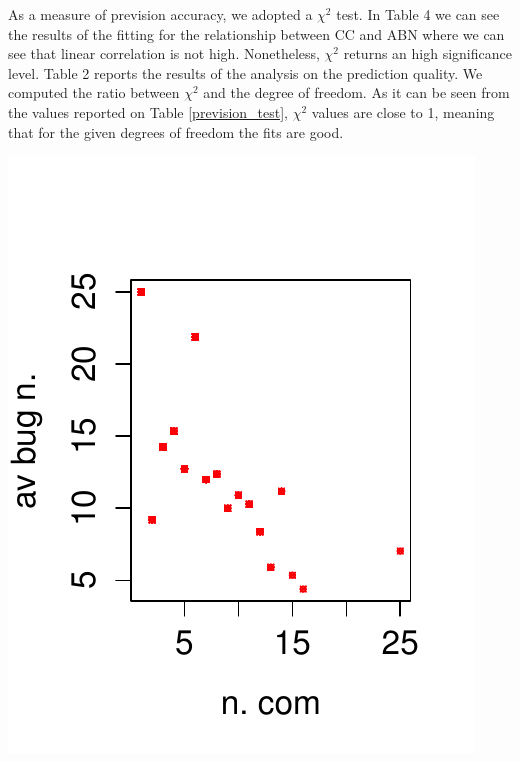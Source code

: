 As a measure of prevision accuracy, we adopted a $\chi^2$ test.
In Table 4 we can see the results of the fitting for the relationship between CC and ABN where we can see that 
linear correlation is not high. Nonetheless, $\chi^2$ returns an high significance level.
Table 2 %
reports the results of the analysis on the prediction quality. 
We computed the ratio between $\chi^2$ and the degree of freedom. 
As it can be seen from the values reported on Table \ref{prevision_test}, $\chi^2$ values are close to 1, 
meaning that for the given degrees of freedom the fits are good.


  \begin{minipage}{\textwidth}
  \begin{minipage}{0.3 \textwidth}
    \centering
    \vspace{10pt} \includegraphics[width=\textwidth]{figure/EC_BUG_power_law-eps-converted-to.pdf}

\end{minipage}
\end{minipage}
